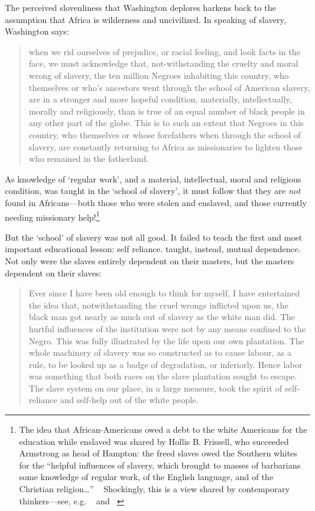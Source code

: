 The perceived slovenliness that Washington deplores harkens back to the assumption that Africa is wilderness and uncivilized. In speaking of slavery, Washington says: 

\begin{quote}

when we rid ourselves of prejudice, or racial feeling, and look facts in the face, we must acknowledge that, not-withstanding the cruelty and moral wrong of slavery, the ten million Negroes inhabiting this country, who themselves or who's ancestors went through the school of American slavery, are in a stronger and more hopeful condition, materially, intellectually, morally and religiously, than is true of an equal number of black people in any other part of the globe. This is to such an extent that Negroes in this country, who themselves or whose forefathers when through the school of slavery, are constantly returning to Africa as missionaries to lighten those who remained in the fatherland. ~\citep[p. 9--10]{Washington:1952uf}
\end{quote}

As knowledge of `regular work', and a material, intellectual, moral and religious condition, was taught in the `school of slavery', it must follow that they are \emph{not} found in Africans---both those who were stolen and enslaved, and those currently needing missionary help!\footnote{The idea that African-Americans owed a debt to the white Americans for the education while enslaved was shared by Hollis B. Frissell, who succeeded Armstrong as head of Hampton: the freed slaves owed the Southern whites for the ``helpful influences of slavery, which brought to masses of barbarians some knowledge of regular work, of the English language, and of the Christian religion{\ldots}'' ~\citep[Quoted on p. 25]{Spivey:1978un} Shockingly, this is a view shared by contemporary thinkers---see, e.g. ~\citep{MCCUEN:2017wm} and ~\citep{Howard:2012ks}}

But the `school' of slavery was not all good. It failed to teach the first and most important educational lesson: self reliance. taught, instead, mutual dependence. Not only were the slaves entirely dependent on their masters, but the masters dependent on their slaves:

\begin{quote}

Ever since I have been old enough to think for myself, I have entertained the idea that, notwithstanding the cruel wrongs inflicted upon us, the black man got nearly as much out of slavery as the white man did. The hurtful influences of the institution were not by any means confined to the Negro. This was fully illustrated by the life upon our own plantation. The whole machinery of slavery was so constructed as to cause labour, as a rule, to be looked up as a badge of degradation, or inferiorly. Hence labor was something that both races on the slave plantation sought to escape. The slave system on our place, in a large measure, took the spirit of self-reliance and self-help out of the white people. ~\citep[p. 10]{Washington:1952uf}
\end{quote}

